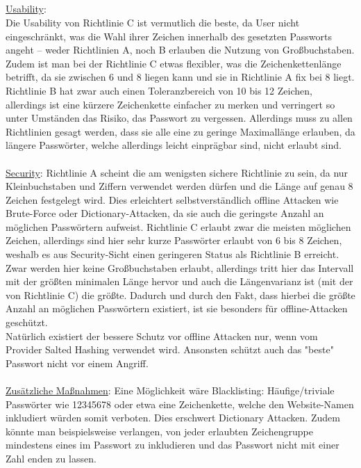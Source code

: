 \subsection{}
\underline{Usability}: \\
Die Usability von Richtlinie C ist vermutlich die beste, da User nicht eingeschränkt, was die Wahl ihrer Zeichen innerhalb des gesetzten Passworts angeht -- weder Richtlinien A, noch B erlauben die Nutzung von Großbuchstaben. Zudem ist man bei der Richtlinie C etwas flexibler, was die Zeichenkettenlänge betrifft, da sie zwischen 6 und 8 liegen kann und sie in Richtlinie A fix bei 8 liegt. Richtlinie B hat zwar auch einen Toleranzbereich von 10 bis 12 Zeichen, allerdings ist eine kürzere Zeichenkette einfacher zu merken und verringert so unter Umständen das Risiko, das Passwort zu vergessen. Allerdings muss zu allen Richtlinien gesagt werden, dass sie alle eine zu geringe Maximallänge erlauben, da längere Passwörter, welche allerdings leicht einprägbar sind, nicht erlaubt sind. \\ \\
\underline{Security}:
Richtlinie A scheint die am wenigsten sichere Richtlinie zu sein, da nur Kleinbuchstaben und Ziffern verwendet werden dürfen und die Länge auf genau 8 Zeichen festgelegt wird. Dies erleichtert selbstverständlich offline Attacken wie Brute-Force oder Dictionary-Attacken, da sie auch die geringste Anzahl an möglichen Passwörtern aufweist. 
Richtlinie C erlaubt zwar die meisten möglichen Zeichen, allerdings sind hier sehr kurze Passwörter erlaubt von 6 bis 8 Zeichen, weshalb es aus Security-Sicht einen geringeren Status als Richtlinie B erreicht. Zwar werden hier keine Großbuchstaben erlaubt, allerdings tritt hier das Intervall mit der größten minimalen Länge hervor und auch die Längenvarianz ist (mit der von Richtlinie C) die größte. Dadurch und durch den Fakt, dass hierbei die größte Anzahl an möglichen Passwörtern existiert, ist sie besonders für offline-Attacken geschützt.
\\
Natürlich existiert der bessere Schutz vor offline Attacken nur, wenn vom Provider Salted Hashing verwendet wird. Ansonsten schützt auch das "beste" Passwort nicht vor einem Angriff.
\\
\\
\underline{Zusätzliche Maßnahmen}:
Eine Möglichkeit wäre Blacklisting: Häufige/triviale Passwörter wie 12345678 oder etwa eine Zeichenkette, welche den Website-Namen inkludiert würden somit verboten. Dies erschwert Dictionary Attacken. Zudem könnte man beispielsweise verlangen, von jeder erlaubten Zeichengruppe mindestens eines im Passwort zu inkludieren und das Passwort nicht mit einer Zahl enden zu lassen.

